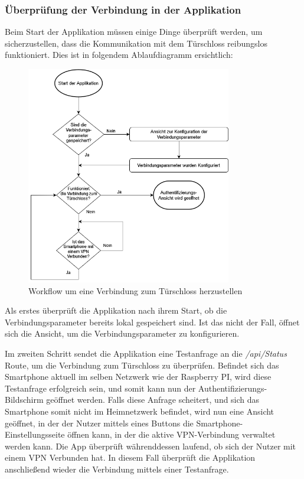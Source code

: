 \subsubsection{Überprüfung der Verbindung in der Applikation}
Beim Start der Applikation müssen einige Dinge überprüft werden, um sicherzustellen, dass die Kommunikation mit 
dem Türschloss reibungslos funktioniert. Dies ist in folgendem Ablaufdiagramm ersichtlich:
\begin{figure}[H]
    \begin{center}
        \includegraphics[width=0.8\textwidth]{images/mobile/Startup.png}
        \caption{Workflow um eine Verbindung zum Türschloss herzustellen}
    \end{center}
\end{figure}
Als erstes überprüft die Applikation nach ihrem Start, ob die Verbindungsparameter bereits lokal gespeichert sind.
Ist das nicht der Fall, öffnet sich die Ansicht, um die Verbindungsparameter zu konfigurieren.

Im zweiten Schritt sendet die Applikation eine Testanfrage an die \textit{/api/Status} Route, um die Verbindung 
zum Türschloss zu überprüfen.
Befindet sich das Smartphone aktuell im selben Netzwerk wie der Raspberry PI, wird diese Testanfrage erfolgreich sein, 
und somit kann nun der Authentifizierungs-Bildschirm geöffnet werden.
\pagebreak
Falls diese Anfrage scheitert, und sich das Smartphone somit nicht im Heimnetzwerk befindet, 
wird nun eine Ansicht geöffnet, in der der Nutzer mittels eines Buttons
die Smartphone-Einstellungsseite öffnen kann, in der die aktive VPN-Verbindung verwaltet werden kann.
Die App überprüft währenddessen laufend, ob sich der Nutzer mit einem VPN Verbunden hat.
In diesem Fall überprüft die Applikation anschließend wieder die Verbindung mittels einer Testanfrage. 

